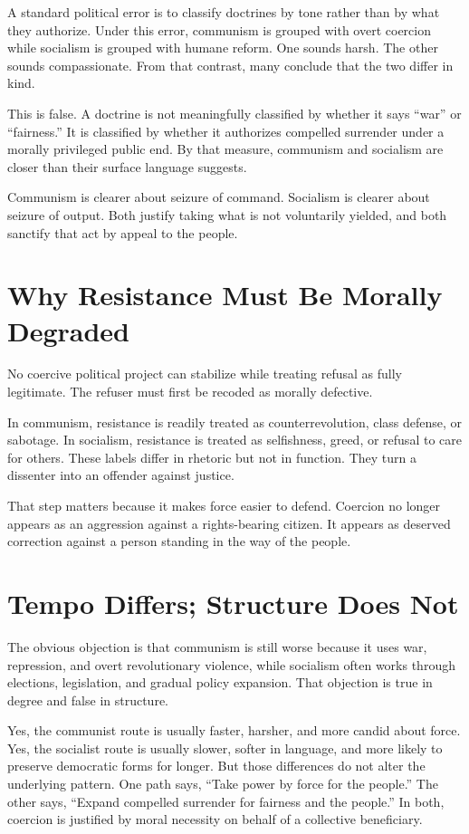 \documentclass[12pt,letterpaper]{article}
\begin{document}
A standard political error is to classify doctrines by tone rather than by what they authorize.
Under this error, communism is grouped with overt coercion while socialism is grouped with
humane reform. One sounds harsh. The other sounds compassionate. From that contrast,
many conclude that the two differ in kind.

This is false. A doctrine is not meaningfully classified by whether it says ``war'' or
``fairness.'' It is classified by whether it authorizes compelled surrender under a morally
privileged public end. By that measure, communism and socialism are closer than their
surface language suggests.

Communism is clearer about seizure of command. Socialism is clearer about seizure of output.
Both justify taking what is not voluntarily yielded, and both sanctify that act by appeal to
the people.

\section{Why Resistance Must Be Morally Degraded}

No coercive political project can stabilize while treating refusal as fully legitimate. The
refuser must first be recoded as morally defective.

In communism, resistance is readily treated as counterrevolution, class defense, or sabotage.
In socialism, resistance is treated as selfishness, greed, or refusal to care for others. These
labels differ in rhetoric but not in function. They turn a dissenter into an offender against
justice.

That step matters because it makes force easier to defend. Coercion no longer appears as an
aggression against a rights-bearing citizen. It appears as deserved correction against a person
standing in the way of the people.

\section{Tempo Differs; Structure Does Not}

The obvious objection is that communism is still worse because it uses war, repression, and
overt revolutionary violence, while socialism often works through elections, legislation, and
gradual policy expansion. That objection is true in degree and false in structure.

Yes, the communist route is usually faster, harsher, and more candid about force. Yes, the
socialist route is usually slower, softer in language, and more likely to preserve democratic
forms for longer. But those differences do not alter the underlying pattern. One path says,
``Take power by force for the people.'' The other says, ``Expand compelled surrender for
fairness and the people.'' In both, coercion is justified by moral necessity on behalf of a
collective beneficiary.
\end{document}

